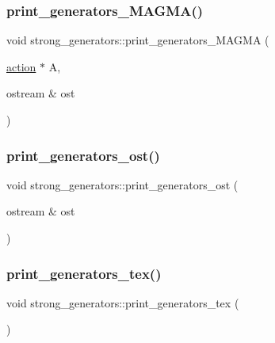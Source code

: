 \subsubsection{\texorpdfstring{print\+\_\+generators\+\_\+\+M\+A\+G\+M\+A()}{print\_generators\_MAGMA()}}
{\footnotesize\ttfamily void strong\+\_\+generators\+::print\+\_\+generators\+\_\+\+M\+A\+G\+MA (\begin{DoxyParamCaption}\item[{\mbox{\hyperlink{classaction}{action}} $\ast$}]{A,  }\item[{ostream \&}]{ost }\end{DoxyParamCaption})}

\mbox{\label{classstrong__generators_a7d93ea4f786018272e813207f3c124b4}} 
\subsubsection{\texorpdfstring{print\+\_\+generators\+\_\+ost()}{print\_generators\_ost()}}
{\footnotesize\ttfamily void strong\+\_\+generators\+::print\+\_\+generators\+\_\+ost (\begin{DoxyParamCaption}\item[{ostream \&}]{ost }\end{DoxyParamCaption})}

\mbox{\label{classstrong__generators_a5ec5e1048119097985c01a56f427d873}} 
\subsubsection{\texorpdfstring{print\+\_\+generators\+\_\+tex()}{print\_generators\_tex()}\hspace{0.1cm}{\footnotesize\ttfamily [1/2]}}
{\footnotesize\ttfamily void strong\+\_\+generators\+::print\+\_\+generators\+\_\+tex (\begin{DoxyParamCaption}{ }\end{DoxyParamCaption})}

